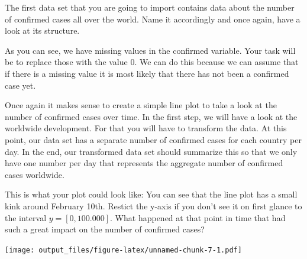 \documentclass[
  11pt,
]{article}
\begin{document}
The first data set that you are going to import contains data about the number of confirmed cases all over the world. Name it accordingly and once again, have a look at its structure.

As you can see, we have missing values in the confirmed variable. Your task will be to replace those with the value 0. We can do this because we can assume that if there is a missing value it is most likely that there has not been a confirmed case yet.

Once again it makes sense to create a simple line plot to take a look at the number of confirmed cases over time. In the first step, we will have a look at the worldwide development. For that you will have to transform the data. At this point, our data set has a separate number of confirmed cases for each country per day. In the end, our transformed data set should summarize this so that we only have one number per day that represents the aggregate number of confirmed cases worldwide.

This is what your plot could look like:
You can see that the line plot has a small kink around February 10th. Restict the y-axis if you don't see it on first glance to the interval \(y =[0,100.000]\). What happened at that point in time that had such a great impact on the number of confirmed cases?

\texttt{[image: output\_files/figure-latex/unnamed-chunk-7-1.pdf]}
\end{document}
